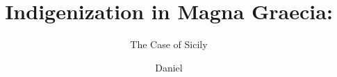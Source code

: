 \documentclass{../../../coursework}
\title{Indigenization in Magna Graecia:}
\subtitle{The Case of Sicily}
\author{Daniel}{Glenn}{Leonard}
\date{\displaydate{date}}
\begin{document}
\maketitle

\nocite{*}

\printbibliography
\end{document}
